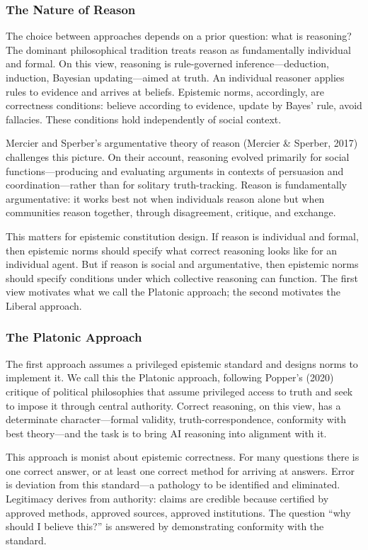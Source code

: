 \subsubsection{The Nature of Reason}\label{the-nature-of-reason}

The choice between approaches depends on a prior question: what is
reasoning? The dominant philosophical tradition treats reason as
fundamentally individual and formal. On this view, reasoning is
rule-governed inference---deduction, induction, Bayesian
updating---aimed at truth. An individual reasoner applies rules to
evidence and arrives at beliefs. Epistemic norms, accordingly, are
correctness conditions: believe according to evidence, update by Bayes'
rule, avoid fallacies. These conditions hold independently of social
context.

Mercier and Sperber's argumentative theory of reason (Mercier \&
Sperber, 2017) challenges this picture. On their account, reasoning
evolved primarily for social functions---producing and evaluating
arguments in contexts of persuasion and coordination---rather than for
solitary truth-tracking. Reason is fundamentally argumentative: it works
best not when individuals reason alone but when communities reason
together, through disagreement, critique, and exchange.

This matters for epistemic constitution design. If reason is individual
and formal, then epistemic norms should specify what correct reasoning
looks like for an individual agent. But if reason is social and
argumentative, then epistemic norms should specify conditions under
which collective reasoning can function. The first view motivates what
we call the Platonic approach; the second motivates the Liberal
approach.

\subsubsection{The Platonic Approach}\label{the-platonic-approach}

The first approach assumes a privileged epistemic standard and designs
norms to implement it. We call this the Platonic approach, following
Popper's (2020) critique of political philosophies that assume
privileged access to truth and seek to impose it through central
authority. Correct reasoning, on this view, has a determinate
character---formal validity, truth-correspondence, conformity with best
theory---and the task is to bring AI reasoning into alignment with it.

This approach is monist about epistemic correctness. For many questions
there is one correct answer, or at least one correct method for arriving
at answers. Error is deviation from this standard---a pathology to be
identified and eliminated. Legitimacy derives from authority: claims are
credible because certified by approved methods, approved sources,
approved institutions. The question ``why should I believe this?'' is
answered by demonstrating conformity with the standard.

